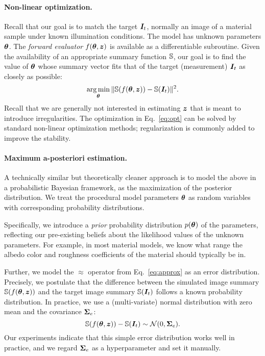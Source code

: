 \paragraph{Non-linear optimization.} Recall that our goal is to match the target $\bm{I}_t$, normally an image of a material sample under known illumination conditions. The model has unknown parameters $\bm{\theta}$. The \emph{forward evaluator} $f(\bm{\theta}, \bm{z})$ is available as a differentiable subroutine.  Given the availability of an appropriate summary function $\mathbb{S}$, our goal is to find the value of $\bm{\theta}$ whose summary vector fits that of the target (measurement) $\bm{I}_t$ as closely as possible:
%
\begin{equation}
	\label{eq:opt}
	\operatorname*{arg\,min}_{\bm{\theta}} \|\mathbb{S}(f(\bm{\theta}, \bm{z})) - \mathbb{S}(\bm{I}_t)\|^2.
\end{equation}
%
Recall that we are generally not interested in estimating $\bm{z}$ that is meant to introduce irregularities.
The optimization in Eq.~\eqref{eq:opt} can be solved by standard non-linear optimization methods; regularization is commonly added to improve the stability.

\paragraph{Maximum a-posteriori estimation.} A technically similar but theoretically cleaner approach is to model the above in a probabilistic Bayesian framework, as the maximization of the posterior distribution. We treat the procedural model parameters $\bm{\theta}$ %
as random variables with corresponding probability distributions.

Specifically, we introduce a \emph{prior} probability distribution $p(\bm{\theta})$ of the parameters, reflecting our pre-existing beliefs about the likelihood values of the unknown parameters. For example, in most material models, we know what range the albedo color and roughness coefficients of the material should typically be in.

Further, we model the $\approx$ operator from Eq.~\eqref{eq:approx} as an error distribution. Precisely, we postulate that the difference between the simulated image summary $\mathbb{S}(f(\bm{\theta}, \bm{z}))$ and the target %
image summary $\mathbb{S}(\bm{I}_t)$ follows a known probability distribution.
In practice, we use a (multi-variate) normal distribution with zero mean and the covariance $\bm{\Sigma}_e$:
%
\begin{equation}
	\mathbb{S}(f(\bm{\theta}, \bm{z})) - \mathbb{S}(\bm{I}_t) \sim \mathcal{N}(0, \bm{\Sigma}_e).
\end{equation}
%
Our experiments indicate that this simple error distribution works well in practice, and we regard $\bm{\Sigma}_e$ as a hyperparameter and set it manually.


